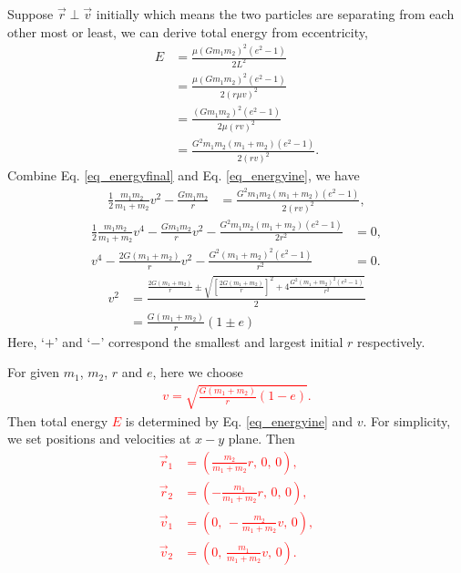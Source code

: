 \documentclass[a4paper,12pt]{article}
\begin{document}
Suppose $\vec{r}\perp\vec{v}$ initially which means the two particles are separating from each other most or least, we can derive total energy from eccentricity,
\begin{align}
    E&=\frac{\mu\left(G m_1 m_2\right)^2\left(e^2-1\right)}{2L^2}\\
    &=\frac{\mu\left(G m_1 m_2\right)^2\left(e^2-1\right)}{2(r\mu v)^2}\\
    &=\frac{(Gm_1 m_2)^2(e^2-1)}{2\mu (rv)^2}\\
    &=\frac{G^2m_1 m_2(m_1+m_2)(e^2-1)}{2(rv)^2}.\label{eq_energyine}
\end{align}
Combine Eq. \eqref{eq_energyfinal} and Eq. \eqref{eq_energyine}, we have
\begin{align}
    \frac{1}{2}\frac{m_1 m_2}{m_1+m_2}v^2-\frac{G m_1 m_2}{r}&=\frac{G^2m_1 m_2(m_1+m_2)(e^2-1)}{2(rv)^2},
\end{align}
\begin{align}
    \frac{1}{2}\frac{m_1 m_2}{m_1+m_2}v^4-\frac{Gm_1 m_2}{r}v^2-\frac{G^2m_1 m_2(m_1+m_2)(e^2-1)}{2r^2}&=0,\\
    v^4-\frac{2G(m_1+m_2)}{r}v^2-\frac{G^2(m_1+m_2)^2(e^2-1)}{r^2}&=0.
\end{align}
\begin{align}
    v^2&=\frac{\frac{2G(m_1+m_2)}{r}\pm \sqrt{\left[\frac{2G\left(m_1+m_2\right)}{r}\right]^2+4\frac{G^2(m_1+m_2)^2(e^2-1)}{r^2}}}{2}\\
    &=\frac{G(m_1+m_2)}{r}(1\pm e)
\end{align}
Here, `$+$' and `$-$' correspond the smallest and largest initial $r$ respectively.

For given $m_1$, $m_2$, $r$ and $e$,  here we choose
\textcolor{red}{
\begin{align}
    v=\sqrt{\frac{G(m_1+m_2)}{r}(1-e)}.
\end{align}
}
Then total energy \textcolor{red}{$E$} is determined by Eq. \eqref{eq_energyine} and $v$.
For simplicity, we set positions and velocities at $x-y$ plane.
Then 
\textcolor{red}{
\begin{align}
    \vec{r}_1&=(\frac{m_2}{m_1+m_2}r,\, 0,\, 0),\\
    \vec{r}_2&=(-\frac{m_1}{m_1+m_2}r,\, 0,\, 0),\\
    \vec{v}_1&=(0,\, -\frac{m_2}{m_1+m_2}v,\, 0),\\
    \vec{v}_2&=(0,\, \frac{m_1}{m_1+m_2}v,\, 0).
\end{align}
}
\end{document}
